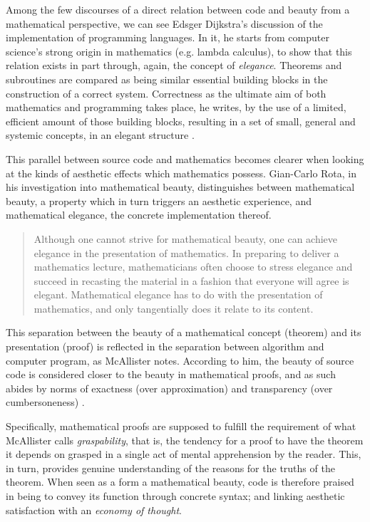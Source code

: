 Among the few discourses of a direct relation between code and beauty from a mathematical perspective, we can see Edsger Dijkstra's discussion of the implementation of programming languages. In it, he starts from computer science's strong origin in mathematics (e.g. lambda calculus), to show that this relation exists in part through, again, the concept of \emph{elegance}. Theorems and subroutines are compared as being similar essential building blocks in the construction of a correct system. Correctness as the ultimate aim of both mathematics and programming takes place, he writes, by the use of a limited, efficient amount of those building blocks, resulting in a set of small, general and systemic concepts, in an elegant structure \citep{dijkstra_design_1963}.

This parallel between source code and mathematics becomes clearer when looking at the kinds of aesthetic effects which mathematics possess. Gian-Carlo Rota, in his investigation into mathematical beauty, distinguishes between mathematical beauty, a property which in turn triggers an aesthetic experience, and mathematical elegance, the concrete implementation thereof.

\begin{quote}
  Although one cannot strive for mathematical beauty, one can achieve elegance in the presentation of mathematics. In preparing to deliver a mathematics lecture, mathematicians often choose to stress elegance and succeed in recasting the material in a fashion that everyone will agree is elegant. Mathematical elegance has to do with the presentation of mathematics, and only tangentially does it relate to its content. \citep{rota_phenomenology_1997}
\end{quote}

This separation between the beauty of a mathematical concept (theorem) and its presentation (proof) is reflected in the separation between algorithm and computer program, as McAllister notes. According to him, the beauty of source code is considered closer to the beauty in mathematical proofs, and as such abides by norms of exactness (over approximation) and transparency (over cumbersoneness) \citep{mcallister_mathematical_2005}.

Specifically, mathematical proofs are supposed to fulfill the requirement of what McAllister calls \emph{graspability}, that is, the tendency for a proof to have the theorem it depends on grasped in a single act of mental apprehension by the reader. This, in turn, provides genuine understanding of the reasons for the truths of the theorem. When seen as a form a mathematical beauty, code is therefore praised in being to convey its function through concrete syntax; and linking aesthetic satisfaction with an \emph{economy of thought}.

